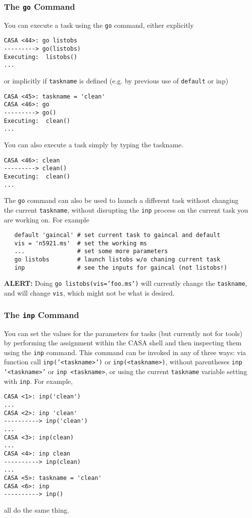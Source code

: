 \subsubsection{The {\tt go} Command}
\label{section:intro.tasks.setpar.go}

You can execute a task using the {\tt go} command, either explicitly
\small
\begin{verbatim}
CASA <44>: go listobs
---------> go(listobs)
Executing:  listobs()
...
\end{verbatim}
\normalsize
or implicitly
if {\tt taskname} is defined (e.g. by previous use of {\tt default}
or {inp})
\small
\begin{verbatim}
CASA <45>: taskname = 'clean'
CASA <46>: go
---------> go()
Executing:  clean()
...
\end{verbatim}
\normalsize

You can also execute a task simply by typing the taskname.
\small
\begin{verbatim}
CASA <46>: clean
---------> clean()
Executing:  clean()
...
\end{verbatim}
\normalsize

The {\tt go} command can also be used to launch a different task without
changing the current {\tt taskname}, without disrupting the 
{\tt inp} process on the current task you are working on.  For
example
\small
\begin{verbatim}
   default 'gaincal' # set current task to gaincal and default
   vis = 'n5921.ms'  # set the working ms
   ...               # set some more parameters
   go listobs        # launch listobs w/o chaning current task
   inp               # see the inputs for gaincal (not listobs!)
\end{verbatim}
\normalsize
{\bf ALERT:} Doing {\tt go listobs(vis='foo.ms')} will currently
change the {\tt taskname}, and will change {\tt vis}, which might
not be what is desired.

\subsubsection{The {\tt inp} Command}
\label{section:intro.tasks.setpar.inp}

You can set the values for the parameters for tasks (but currently not
for tools) by performing the assignment within the CASA shell and then
inspecting them using the {\tt inp} command.  This command can be
invoked in any of three ways: 
via function call {\tt inp('<taskname>')} or {\tt inp(<taskname>)}, 
without parentheses {\tt inp '<taskname>'} or {\tt inp <taskname>},
or using the current {\tt taskname} variable setting with {\tt inp}.
For example,
\small
\begin{verbatim}
CASA <1>: inp('clean')
...
CASA <2>: inp 'clean'
----------> inp('clean')
...
CASA <3>: inp(clean)
...
CASA <4>: inp clean
----------> inp(clean)
...
CASA <5>: taskname = 'clean'
CASA <6>: inp
----------> inp()
\end{verbatim}
\normalsize
all do the same thing. 

